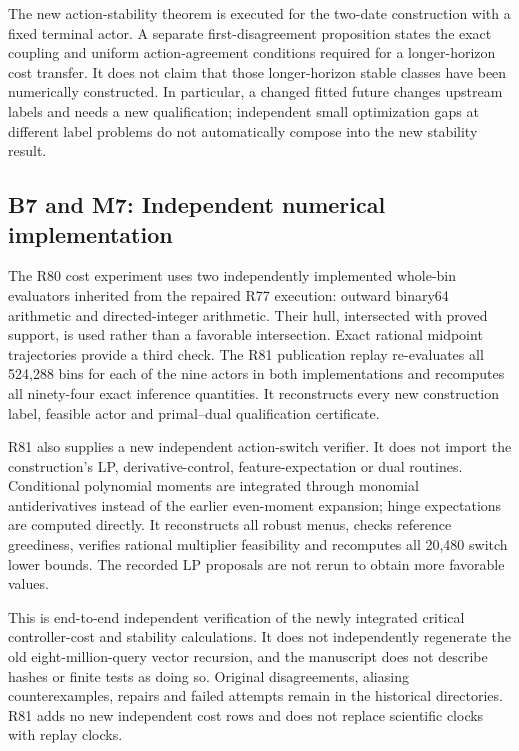 \documentclass[ecta,nameyear,draft]{econsocart}
\begin{document}
The new action-stability theorem is executed for the two-date
construction with a fixed terminal actor. A separate first-disagreement
proposition states the exact coupling and uniform action-agreement
conditions required for a longer-horizon cost transfer. It does not
claim that those longer-horizon stable classes have been numerically
constructed. In particular, a changed fitted future changes upstream
labels and needs a new qualification; independent small optimization
gaps at different label problems do not automatically compose into the
new stability result.

\hypertarget{b7-and-m7-independent-numerical-implementation}{%
\subsection{B7 and M7: Independent numerical
implementation}\label{b7-and-m7-independent-numerical-implementation}}

The R80 cost experiment uses two independently implemented whole-bin
evaluators inherited from the repaired R77 execution: outward binary64
arithmetic and directed-integer arithmetic. Their hull, intersected with
proved support, is used rather than a favorable intersection. Exact
rational midpoint trajectories provide a third check. The R81
publication replay re-evaluates all 524,288 bins for each of the nine
actors in both implementations and recomputes all ninety-four exact
inference quantities. It reconstructs every new construction label,
feasible actor and primal--dual qualification certificate.

R81 also supplies a new independent action-switch verifier. It does not
import the construction's LP, derivative-control, feature-expectation or
dual routines. Conditional polynomial moments are integrated through
monomial antiderivatives instead of the earlier even-moment expansion;
hinge expectations are computed directly. It reconstructs all robust
menus, checks reference greediness, verifies rational multiplier
feasibility and recomputes all 20,480 switch lower bounds. The recorded
LP proposals are not rerun to obtain more favorable values.

This is end-to-end independent verification of the newly integrated
critical controller-cost and stability calculations. It does not
independently regenerate the old eight-million-query vector recursion,
and the manuscript does not describe hashes or finite tests as doing so.
Original disagreements, aliasing counterexamples, repairs and failed
attempts remain in the historical directories. R81 adds no new
independent cost rows and does not replace scientific clocks with replay
clocks.
\end{document}
